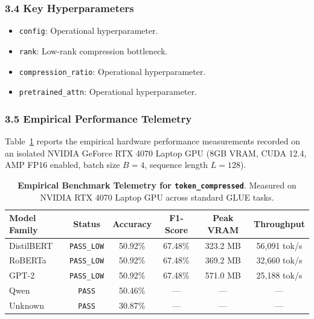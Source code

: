 \subsubsection*{3.4 Key Hyperparameters}
\begin{itemize}
    \item \texttt{config}: Operational hyperparameter.
    \item \texttt{rank}: Low-rank compression bottleneck.
    \item \texttt{compression\_ratio}: Operational hyperparameter.
    \item \texttt{pretrained\_attn}: Operational hyperparameter.
\end{itemize}

\subsubsection*{3.5 Empirical Performance Telemetry}
Table~\ref{tab:telemetry_token_compressed} reports the empirical hardware performance measurements recorded on an isolated NVIDIA GeForce RTX 4070 Laptop GPU (8GB VRAM, CUDA 12.4, AMP FP16 enabled, batch size $B=4$, sequence length $L=128$).

\begin{table}[h]
\centering
\small
\caption{\textbf{Empirical Benchmark Telemetry for \texttt{token\_compressed}}. Measured on NVIDIA RTX 4070 Laptop GPU across standard GLUE tasks.}
\label{tab:telemetry_token_compressed}
\begin{tabular*}{\columnwidth}{@{\extracolsep{\fill}}lccccc}
\toprule
\textbf{Model Family} & \textbf{Status} & \textbf{Accuracy} & \textbf{F1-Score} & \textbf{Peak VRAM} & \textbf{Throughput} \\
\midrule
DistilBERT & \texttt{PASS\_LOW} & 50.92\% & 67.48\% & 323.2 MB & 56,091 tok/s \\
RoBERTa & \texttt{PASS\_LOW} & 50.92\% & 67.48\% & 369.2 MB & 32,660 tok/s \\
GPT-2 & \texttt{PASS\_LOW} & 50.92\% & 67.48\% & 571.0 MB & 25,188 tok/s \\
Qwen & \texttt{PASS} & 50.46\% & --- & --- & --- \\
Unknown & \texttt{PASS} & 30.87\% & --- & --- & --- \\
\bottomrule
\end{tabular*}
\end{table}

